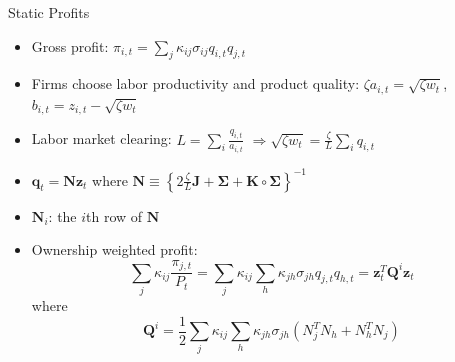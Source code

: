 \documentclass[
  10pt,
  aspectratio=169,   %
]{beamer}
\theoremstyle{plain}
\begin{document}
\begin{frame}{Static Profits}
  \label{Q}
  \begin{itemize}
    \item Gross profit: $\pi_{i,t}=\sum_{j}\kappa_{ij}\sigma_{ij}q_{i,t}q_{j,t}$
    \item Firms choose labor productivity and product quality: $\zeta a_{i,t}=\sqrt{\zeta w_{t}}$, $b_{i,t}=z_{i,t}-\sqrt{\zeta w_{t}}$
    \item Labor market clearing: $L=\sum_{i}\frac{q_{i,t}}{a_{i,t}}$ $\Longrightarrow$$\sqrt{\zeta w_{t}}=\frac{\zeta}{L}\sum_{i}q_{i,t}$
    \item $\bm{q}_{t}=\bm{N}\bm{z}_{t}$ where $\bm{N}\equiv\left\{ 2\frac{\zeta}{L}\bm{J}+\bm{\Sigma}+\bm{K}\circ\bm{\Sigma}\right\} ^{-1}$
    \item $\bm{N}_{i}$: the $i$th row of $\bm{N}$
    \item Ownership weighted profit:
          {\small
          \[
            \sum_{j}\kappa_{ij}\frac{\pi_{j,t}}{P_{t}}=\sum_{j}\kappa_{ij}\sum_{h}\kappa_{jh}\sigma_{jh}q_{j,t}q_{h,t}=\bm{z}_{t}^{T}\bm{Q}^{i}\bm{z}_{t}
          \]}
          where
            {\small
              \[
                \bm{Q}^{i}=\frac{1}{2}\sum_{j}\kappa_{ij}\sum_{h}\kappa_{jh}\sigma_{jh}\left(N_{j}^{T}N_{h}+N_{h}^{T}N_{j}\right)
              \]}
          \hyperlink{cournot}{}
  \end{itemize}
\end{frame}
\end{document}
